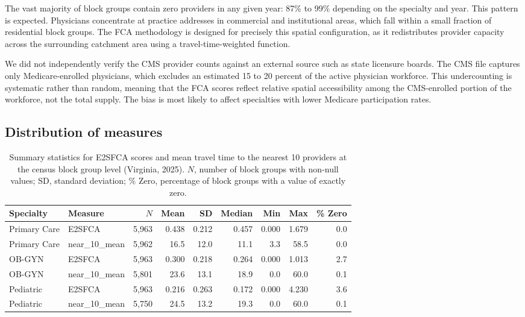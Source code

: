 \documentclass{CUP-JNL-DAP}%
\begin{document}
The vast majority of block groups contain zero providers in any given year: 87\% to 99\% depending on the specialty and year. This pattern is expected. Physicians concentrate at practice addresses in commercial and institutional areas, which fall within a small fraction of residential block groups. The FCA methodology is designed for precisely this spatial configuration, as it redistributes provider capacity across the surrounding catchment area using a travel-time-weighted function.

We did not independently verify the CMS provider counts against an external source such as state licensure boards. The CMS file captures only Medicare-enrolled physicians, which excludes an estimated 15 to 20 percent of the active physician workforce. This undercounting is systematic rather than random, meaning that the FCA scores reflect relative spatial accessibility among the CMS-enrolled portion of the workforce, not the total supply. The bias is most likely to affect specialties with lower Medicare participation rates.

\subsection{Distribution of measures}

\begin{table}[ht]
\centering
\caption{Summary statistics for E2SFCA scores and mean travel time to the nearest 10 providers at the census block group level (Virginia, 2025). $N$, number of block groups with non-null values; SD, standard deviation; \% Zero, percentage of block groups with a value of exactly zero.}
\label{tab:summary}
\small
\begin{tabular}{llrrrrrrr}
\toprule
Specialty & Measure & $N$ & Mean & SD & Median & Min & Max & \% Zero \\
\midrule
Primary Care & E2SFCA & 5{,}963 & 0.438 & 0.212 & 0.457 & 0.000 & 1.679 & 0.0 \\
Primary Care & near\_10\_mean & 5{,}962 & 16.5 & 12.0 & 11.1 & 3.3 & 58.5 & 0.0 \\
\midrule
OB-GYN & E2SFCA & 5{,}963 & 0.300 & 0.218 & 0.264 & 0.000 & 1.013 & 2.7 \\
OB-GYN & near\_10\_mean & 5{,}801 & 23.6 & 13.1 & 18.9 & 0.0 & 60.0 & 0.1 \\
\midrule
Pediatric & E2SFCA & 5{,}963 & 0.216 & 0.263 & 0.172 & 0.000 & 4.230 & 3.6 \\
Pediatric & near\_10\_mean & 5{,}750 & 24.5 & 13.2 & 19.3 & 0.0 & 60.0 & 0.1 \\
\bottomrule
\end{tabular}
\end{table}
\end{document}

